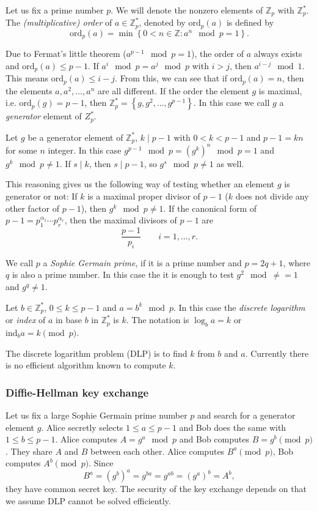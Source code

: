 \documentclass{article}
\newcommand{\Z}{\mathbb{Z}}
\begin{document}
Let us fix a prime number $p$. We will denote the nonzero elements of $\Z_p$ with $\Z_p^*$.
The \emph{(multiplicative) order} of $a \in \Z_p^*$, denoted by $\mathrm{ord}_p(a)$ is defined by
\[
    \mathrm{ord}_p(a) = \min\left\{ 0 < n \in \Z : a^{n} \mod p = 1 \right\}.
\]

Due to Fermat's little theorem ($a^{p-1} \mod p = 1$), the order of $a$ always exists and $\mathrm{ord}_p(a) \le p-1$.
If $a^i \mod p = a^j \mod p$ with $i > j$, then $a^{i-j} \mod 1$. This means $\mathrm{ord}_p(a) \le i-j$.
From this, we can see that if $\mathrm{ord}_p(a) = n$, then the elements $a, a^2, \ldots, a^n$ are all different.
If the order the element $g$ is maximal, i.e. $\mathrm{ord}_p(g) = p - 1$, then $\Z_p^* = \left\{ g, g^2, \ldots, g^{p-1} \right\}$.
In this case we call $g$ a \emph{generator} element of $Z_p^*$.

Let $g$ be a generator element of $\Z_p^*$, $k \mid p-1$ with $0 < k < p-1$ and $p-1 = kn$ for some $n$ integer.
In this case $g^{p-1} \mod p = (g^k)^n \mod p = 1$ and $g^k \mod p \neq 1$.
If $s \mid k$, then $s \mid p-1$, so $g^s \mod p \neq 1$ as well.

This reasoning gives us the following way of testing whether an element $g$ is generator or not:
If $k$ is a maximal proper divisor of $p-1$ ($k$ does not divide any other factor of $p-1$), then $g^k \mod p \neq 1$.
If the canonical form of $p-1 = p_1^{\alpha_1}\cdots p_r^{\alpha_r}$, then the maximal divisors of $p-1$ are
\[
    \frac{p-1}{p_i} \qquad i=1,\ldots,r.
\]

We call $p$ a \emph{Sophie Germain prime}, if it is a prime number and $p=2q+1$, where $q$ is also a prime number.
In this case the it is enough to test $g^2 \mod \neq = 1$ and $g^{q} \neq 1$.

Let $b \in \Z_p^*$, $0 \le k \le p-1$ and $a = b^k \mod p$.
In this case the \emph{discrete logarithm} or \emph{index} of $a$ in base $b$ in $\Z_p^*$ is $k$.
The notation is $\log_b a = k$ or $\mathrm{ind}_b a = k \pmod{p}$.

The discrete logarithm problem (DLP) is to find $k$ from $b$ and $a$.
Currently there is no efficient algorithm known to compute $k$.

\subsubsection{Diffie-Hellman key exchange}

Let us fix a large Sophie Germain prime number $p$ and search for a generator element $g$.
Alice secretly selects $1 \le a \le p-1$ and Bob does the same with $1 \le b \le p-1$.
Alice computes $A = g^a \mod p$ and Bob computes $B = g^b \pmod p$.
They share $A$ and $B$ between each other.
Alice computes $B^a \pmod p$, Bob computes $A^b \pmod p$.
Since
\[
    B^a = (g^b)^a = g^{ba} = g^{ab} = (g^a)^b = A^b,
\]
they have common secret key.
The security of the key exchange depends on that we assume DLP cannot be solved efficiently.
\end{document}
